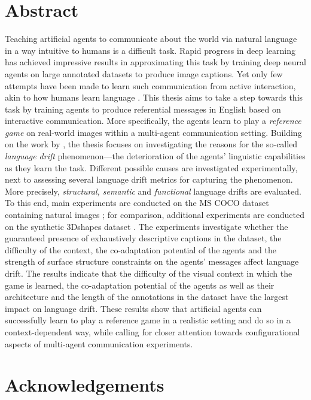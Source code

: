 \documentclass[11pt, twoside, openright]{report} %
\begin{document}
	
	
	\chapter*{Abstract}
	Teaching artificial agents to communicate about the world via natural language in a way intuitive to humans is a difficult task. Rapid progress in deep learning has achieved impressive results in approximating this task by training deep neural agents on large annotated datasets to produce image captions. Yet only few attempts have been made to learn such communication from active interaction, akin to how humans learn language \parencite[e.g.,][]{clark1996using}.
	This thesis aims to take a step towards this task by training agents to produce referential messages in English based on interactive communication. More specifically, the agents learn to play a \emph{reference game} on real-world images within a multi-agent communication setting. Building on the work by \cite{lazaridou2020multi}, the thesis focuses on investigating the reasons for the so-called \emph{language drift} phenomenon---the deterioration of the agents' linguistic capabilities as they learn the task. Different possible causes are investigated experimentally, next to assessing several language drift metrics for capturing the phenomenon. More precisely, \emph{structural, semantic} and \emph{functional} language drifts are evaluated.
	To this end, main experiments are conducted on the MS COCO dataset containing natural images \parencite{chen2015microsoft}; for comparison, additional experiments are conducted on the synthetic 3Dshapes dataset \parencite{burgess20183d}.
	The experiments investigate whether the guaranteed presence of exhaustively descriptive captions in the dataset, the difficulty of the context, the co-adaptation potential of the agents and the strength of surface structure constraints on the agents' messages affect language drift. The results indicate that the difficulty of the visual context in which the game is learned, the co-adaptation potential of the agents as well as their architecture and the length of the annotations in the dataset have the largest impact on language drift. These results show that artificial agents can successfully learn to play a reference game in a realistic setting and do so in a context-dependent way, while calling for closer attention towards configurational aspects of multi-agent communication experiments.  
	
	
	\chapter*{Acknowledgements}
	
\end{document}
